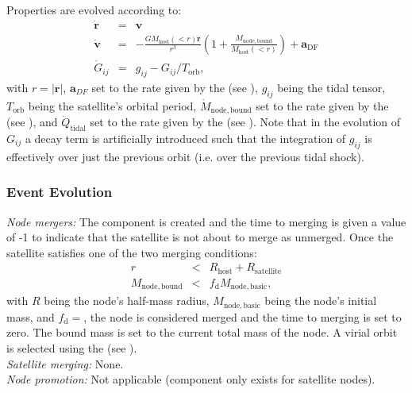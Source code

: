 Properties are evolved according to:
\begin{eqnarray}
\dot{\mathbf{r}}&=&\mathbf{v}\\
\dot{\mathbf{v}}&=&-\frac{G M_\mathrm{host}(<r)\mathbf{r}}{r^3}\left(1+\frac{M_\mathrm{node,bound}}{M_\mathrm{host}(<r)}\right)+\mathbf{a}_\mathrm{DF}\\
\dot{G}_{ij}&=&g_{ij}-G_{ij}/T_\mathrm{orb},
\end{eqnarray}
with $r=|\mathbf{r}|$, $\mathbf{a}_{DF}$ set to the rate given by the  (see ), $g_{ij}$ being the tidal tensor, $T_\mathrm{orb}$ being the satellite's orbital period, $\dot{M}_\mathrm{node,bound}$ set to the rate given by the  (see ), and $\dot{Q}_\mathrm{tidal}$ set to the rate given by the  (see ). Note that in the evolution of $G_{ij}$ a decay term is artificially introduced such that the integration of $g_{ij}$ is effectively over just the previous orbit (i.e. over the previous tidal shock).

\subsubsection{Event Evolution}

\noindent\emph{Node mergers:} The \gls{component} is created and the time to merging is given a value of -1 to indicate that the satellite is not about to merge as unmerged.  Once the satellite satisfies one of the two merging conditions:
\begin{eqnarray}
r&<&R_\mathrm{host}+R_\mathrm{satellite}\\
M_\mathrm{node,bound}&<&f_\mathrm{d} M_\mathrm{node,basic},
\end{eqnarray}
with $R$ being the node's half-mass radius, $M_\mathrm{node,basic}$ being the node's initial mass, and $f_\mathrm{d}=$\mono{[satelliteOrbitingDestructionMassFraction]}, the node is considered merged and the time to merging is set to zero. The bound mass is set to the current total mass of the node. A virial orbit is selected using the  (see ). \\

\noindent\emph{Satellite merging:} None.\\

\noindent\emph{Node promotion:} Not applicable (component only exists for satellite nodes).\\

